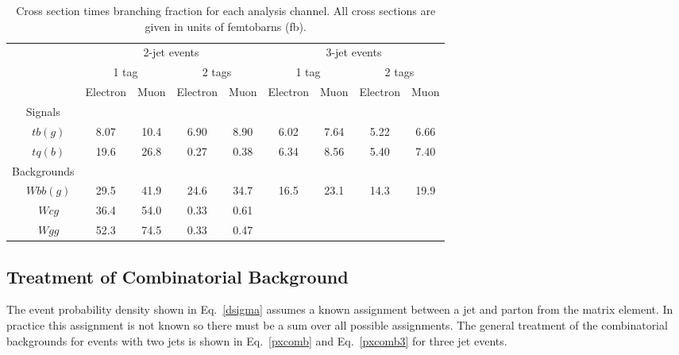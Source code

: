 \begin{table}[!h!tbp]
\begin{center}
\caption{Cross section times branching fraction for each
analysis channel. All cross sections are given in units of femtobarns (fb).}
\label{cross-sections}
\begin{tabular}{c|cccc|cccc}
            & \multicolumn{4}{c|}{2-jet events}
            & \multicolumn{4}{c}{3-jet events} \\
            & \multicolumn{2}{c}{1 tag}
            & \multicolumn{2}{c|}{2 tags}
            & \multicolumn{2}{c}{1 tag}
            & \multicolumn{2}{c}{2 tags}\\
            & Electron &   Muon   & Electron &   Muon
            & Electron &   Muon   & Electron &   Muon   \\
\hline
Signals     &    &     &     &    &    &     &    &     \\
~~$tb(g)$   &   8.07   &   10.4   &   6.90   &   8.90   
            &   6.02   &   7.64   &   5.22   &   6.66   \\
~~$tq(b)$   &  19.6    &   26.8   &   0.27   &   0.38   
            &   6.34   &    8.56  &   5.40   &   7.40   \\
Backgrounds &    &     &     &    &    &     &    &     \\
~~$Wbb(g)$  &  29.5    &   41.9   &  24.6    &  34.7    
            &   16.5   &   23.1   &   14.3   &   19.9   \\
~~$Wcg$     &  36.4    &   54.0   &   0.33   &   0.61   & & & & \\
~~$Wgg$     &  52.3    &   74.5   &   0.33   &   0.47   & & & &  
\end{tabular}
\vspace{-0.1 in}
\end{center}
\end{table}


\subsection{Treatment of Combinatorial Background}
The event probability density shown in Eq.~\ref{dsigma} assumes a known
assignment between a jet and parton from the matrix element. In
practice this assignment is not known so there must be a sum over
all possible assignments. The general treatment of the combinatorial backgrounds for events with two jets is shown in Eq.~\ref{pxcomb} and Eq.~\ref{pxcomb3} for three jet events.

